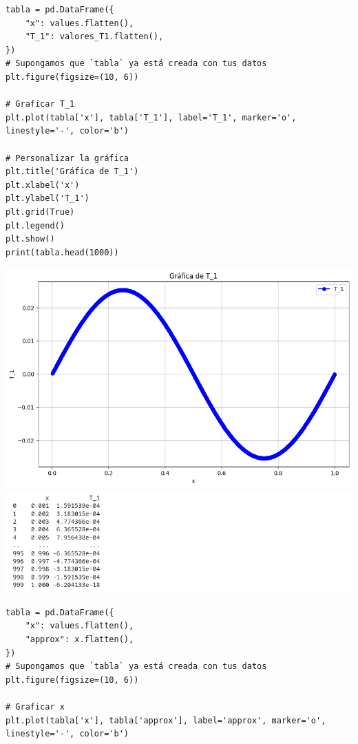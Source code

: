 \begin{homeworkProblem}
\begin{solucion}
\begin{enumerate}[a)]
\begin{lstlisting}
tabla = pd.DataFrame({
    "x": values.flatten(),
    "T_1": valores_T1.flatten(),
})
# Supongamos que `tabla` ya está creada con tus datos
plt.figure(figsize=(10, 6))

# Graficar T_1
plt.plot(tabla['x'], tabla['T_1'], label='T_1', marker='o', linestyle='-', color='b')

# Personalizar la gráfica
plt.title('Gráfica de T_1')
plt.xlabel('x')
plt.ylabel('T_1')
plt.grid(True)
plt.legend()
plt.show()
print(tabla.head(1000))
          \end{lstlisting}
          \begin{center}
            \includegraphics[scale=0.6]{grafica_T1.png}\\
            \includegraphics[scale=1]{code7.png}
          \end{center}
          \newpage
          \begin{lstlisting}
tabla = pd.DataFrame({
    "x": values.flatten(),
    "approx": x.flatten(),
})
# Supongamos que `tabla` ya está creada con tus datos
plt.figure(figsize=(10, 6))

# Graficar x
plt.plot(tabla['x'], tabla['approx'], label='approx', marker='o', linestyle='-', color='b')


\end{lstlisting}
\end{enumerate}
\end{solucion}
\end{homeworkProblem}
